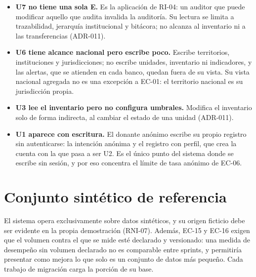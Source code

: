 \documentclass[11pt,a4paper]{article}
\begin{document}
\begin{itemize}
\item \textbf{U7 no tiene una sola E.} Es la aplicación de RI-04: un auditor que puede modificar aquello que audita invalida la auditoría. Su lectura se limita a trazabilidad, jerarquía institucional y bitácora; no alcanza al inventario ni a las transferencias (ADR-011).
\item \textbf{U6 tiene alcance nacional pero escribe poco.} Escribe territorios, instituciones y jurisdicciones; no escribe unidades, inventario ni indicadores, y las alertas, que se atienden en cada banco, quedan fuera de su vista. Su vista nacional agregada no es una excepción a EC-01: el territorio nacional es su jurisdicción propia.
\item \textbf{U3 lee el inventario pero no configura umbrales.} Modifica el inventario solo de forma indirecta, al cambiar el estado de una unidad (ADR-011).
\item \textbf{U1 aparece con escritura.} El donante anónimo escribe su propio registro sin autenticarse: la intención anónima y el registro con perfil, que crea la cuenta con la que pasa a ser U2. Es el único punto del sistema donde se escribe sin sesión, y por eso concentra el límite de tasa anónimo de EC-06.
\end{itemize}

\section{Conjunto sintético de referencia}
\label{sec:sintetico}

El sistema opera exclusivamente sobre datos sintéticos, y su origen ficticio debe ser evidente en la propia demostración (RNI-07). Además, EC-15 y EC-16 exigen que el volumen contra el que se mide esté declarado y versionado: una medida de desempeño sin volumen declarado no es comparable entre sprints, y permitiría presentar como mejora lo que solo es un conjunto de datos más pequeño. Cada trabajo de migración carga la porción de su base.
\end{document}

